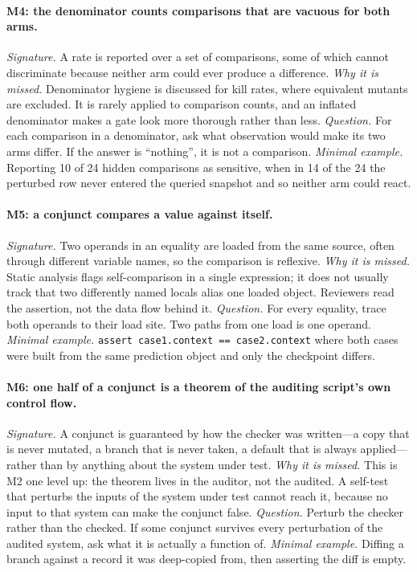 \documentclass[11pt]{article}
\begin{document}
\paragraph{M4: the denominator counts comparisons that are vacuous for both arms.}
\emph{Signature.} A rate is reported over a set of comparisons, some of which cannot discriminate because neither arm could ever produce a difference.
\emph{Why it is missed.} Denominator hygiene is discussed for kill rates, where equivalent mutants are excluded. It is rarely applied to comparison counts, and an inflated denominator makes a gate look more thorough rather than less.
\emph{Question.} For each comparison in a denominator, ask what observation would make its two arms differ. If the answer is ``nothing'', it is not a comparison.
\emph{Minimal example.} Reporting 10 of 24 hidden comparisons as sensitive, when in 14 of the 24 the perturbed row never entered the queried snapshot and so neither arm could react.

\paragraph{M5: a conjunct compares a value against itself.}
\emph{Signature.} Two operands in an equality are loaded from the same source, often through different variable names, so the comparison is reflexive.
\emph{Why it is missed.} Static analysis flags self-comparison in a single expression; it does not usually track that two differently named locals alias one loaded object. Reviewers read the assertion, not the data flow behind it.
\emph{Question.} For every equality, trace both operands to their load site. Two paths from one load is one operand.
\emph{Minimal example.} \texttt{assert case1.context == case2.context} where both cases were built from the same prediction object and only the checkpoint differs.

\paragraph{M6: one half of a conjunct is a theorem of the auditing script's own control flow.}
\emph{Signature.} A conjunct is guaranteed by how the checker was written---a copy that is never mutated, a branch that is never taken, a default that is always applied---rather than by anything about the system under test.
\emph{Why it is missed.} This is M2 one level up: the theorem lives in the auditor, not the audited. A self-test that perturbs the inputs of the system under test cannot reach it, because no input to that system can make the conjunct false.
\emph{Question.} Perturb the checker rather than the checked. If some conjunct survives every perturbation of the audited system, ask what it is actually a function of.
\emph{Minimal example.} Diffing a branch against a record it was deep-copied from, then asserting the diff is empty.
\end{document}
